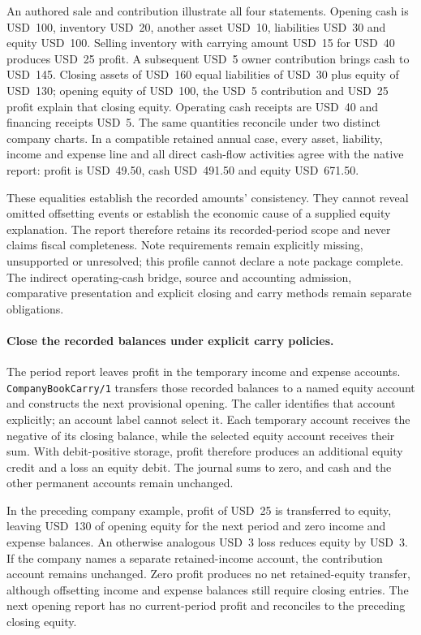 An authored sale and contribution illustrate all four statements. Opening cash
is USD~100, inventory USD~20, another asset USD~10, liabilities USD~30 and equity
USD~100. Selling inventory with carrying amount USD~15 for USD~40 produces
USD~25 profit. A subsequent USD~5 owner contribution brings cash to USD~145.
Closing assets of USD~160 equal liabilities of USD~30 plus equity of USD~130;
opening equity of USD~100, the USD~5 contribution and USD~25 profit explain that
closing equity. Operating cash receipts are USD~40 and financing receipts USD~5.
The same quantities reconcile under two distinct company charts. In a compatible
retained annual case, every asset, liability, income and expense line and all
direct cash-flow activities agree with the native report: profit is USD~49.50,
cash USD~491.50 and equity USD~671.50.

These equalities establish the recorded amounts' consistency. They cannot reveal
omitted offsetting events or establish the economic cause of a supplied equity
explanation. The report therefore retains its recorded-period scope and never
claims fiscal completeness. Note requirements remain explicitly missing,
unsupported or unresolved; this profile cannot declare a note package complete.
The indirect operating-cash bridge, source and accounting admission, comparative
presentation and explicit closing and carry methods remain separate obligations.

\paragraph{Close the recorded balances under explicit carry policies.}
The period report leaves profit in the temporary income and expense accounts.
\texttt{CompanyBookCarry/1} transfers those recorded balances to a named equity
account and constructs the next provisional opening. The caller identifies that
account explicitly; an account label cannot select it. Each temporary account
receives the negative of its closing balance, while the selected equity account
receives their sum. With debit-positive storage, profit therefore produces an
additional equity credit and a loss an equity debit. The journal sums to zero,
and cash and the other permanent accounts remain unchanged.

In the preceding company example, profit of USD~25 is transferred to equity,
leaving USD~130 of opening equity for the next period and zero income and expense
balances. An otherwise analogous USD~3 loss reduces equity by USD~3. If the
company names a separate retained-income account, the contribution account remains
unchanged. Zero profit produces no net retained-equity transfer, although offsetting
income and expense balances still require closing entries. The next opening report
has no current-period profit and reconciles to the preceding closing equity.

